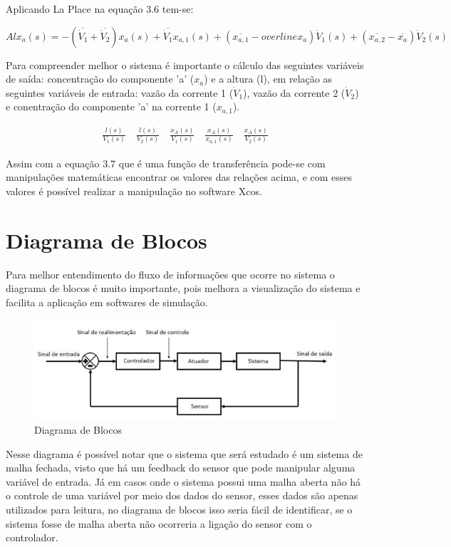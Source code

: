 \documentclass[
	12pt,				%
	openright,			%
	oneside,			%
	a4paper,			%
	english,			%
	french,				%
	spanish,			%
	brazil				%
	]{abntex2}
\begin{document}
Aplicando La Place na equação 3.6 tem-se:

\begin{equation}
Alx_{a}(s) = -(\overline{\dot{V}_{1}}+\overline{\dot{V}_{2}})x_{a}(s) + \overline{\dot{V}_{1}}x_{a,1}(s) + (\overline{x_{a,1}}-overline{x_{a}})\dot{V}_{1}(s) + (\overline{x_{a,2}}-\overline{x_{a}})\dot{V}_{2}(s)
\end{equation}

Para compreender melhor o sistema é importante o cálculo das seguintes variáveis de saída: concentração do componente 'a' ($x_{a}$) e a altura (l), em relação as seguintes variáveis de entrada: vazão da corrente 1 ($\dot{V}_{1}$), vazão da corrente 2 ($\dot{V}_{2}$) e conentração do componente 'a' na corrente 1 ($x_{a,1}$).

\begin{eqnarray}
\frac{l(s)}{V_{1}(s)} \quad
\frac{l(s)}{V_{2}(s)} \quad
\frac{x_{A}(s)}{V_{1}(s)} \quad
\frac{x_{A}(s)}{x_{a,1}(s)} \quad
\frac{x_{A}(s)}{V_{2}(s)}
\end{eqnarray}

Assim com a equação 3.7 que é uma função de transferência pode-se com manipulações matemáticas encontrar os valores das relações acima, e com esses valores é possível realizar a manipulação no software Xcos.


\newpage
\chapter{Diagrama de Blocos}
\pagestyle{fancy}

Para melhor entendimento do fluxo de informações que ocorre no sistema o diagrama de blocos é muito importante, pois melhora a visualização do sistema e facilita a aplicação em softwares de simulação.

\begin{figure}[!h]
\centering
\includegraphics[scale=0.6]{DiagramaBlocos.jpeg} 
\caption{Diagrama de Blocos}
\label{Diagrama}
\end{figure}

Nesse diagrama é possível notar que o sistema que será estudado é um sistema de malha fechada, visto que há um feedback do sensor que pode manipular alguma variável de entrada. Já em casos onde o sistema possui uma malha aberta não há o controle de uma variável por meio dos dados do sensor, esses dados são apenas utilizados para leitura, no diagrama de blocos isso seria fácil de identificar, se o sistema fosse de malha aberta não ocorreria a ligação do sensor com o controlador.
\end{document}

